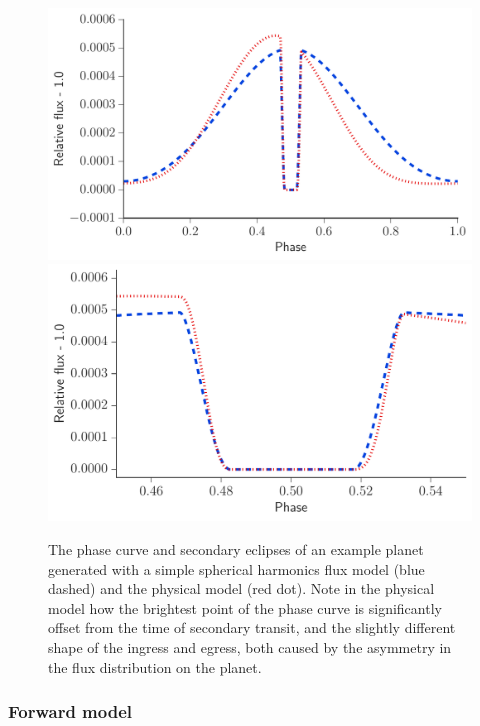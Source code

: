 \documentclass[a4paper,fleqn,usenatbib]{mnras}
\begin{document}
\begin{figure}
\begin{center}
\includegraphics[width=\columnwidth]{img/both_lc.pdf}
\includegraphics[width=\columnwidth]{img/both_lc_zoom.pdf}
\caption{The phase curve and secondary eclipses of an example planet generated with a simple spherical harmonics flux model (blue dashed) and the \citet{Zhang2016} physical model (red dot). Note in the physical model how the brightest point of the phase curve is significantly offset from the time of secondary transit, and the slightly different shape of the ingress and egress, both caused by the asymmetry in the flux distribution on the planet.}
\label{fig:ex_lcs}
\end{center}
\end{figure}

\subsubsection{Forward model}
\end{document}
